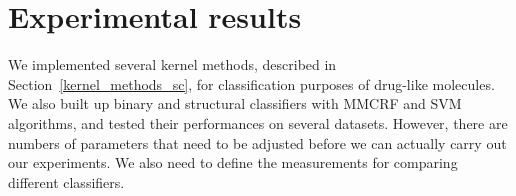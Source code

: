 \documentclass[english]{tktltiki}
\begin{document}

%
%
\clearpage
\section{Experimental results}

We implemented several kernel methods, described in Section~\ref{kernel_methods_sc}, for classification purposes of drug-like molecules. We also built up binary and structural classifiers with MMCRF and SVM algorithms, and tested their performances on several datasets. However, there are numbers of parameters that need to be adjusted before we can actually carry out our experiments. We also need to define the measurements for comparing different classifiers.
\end{document}
